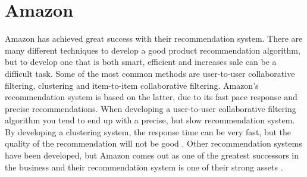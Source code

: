 \section{Amazon}
Amazon has achieved great success with their recommendation system. There are many different techniques to develop a good product recommendation algorithm, but to develop one that is both smart, efficient and increases sale can be a difficult task. Some of the most common methods are user-to-user collaborative filtering, clustering and item-to-item collaborative filtering. Amazon's recommendation system is based on the latter, due to its fast pace response and precise recommendations. When developing a user-to-user collaborative filtering algorithm you tend to end up with a precise, but slow recommendation system. By developing a clustering system, the response time can be very fast, but the quality of the recommendation will not be good \cite{AmazonRecommendations}. Other recommendation systems have been developed, but Amazon comes out as one of the greatest successors in the business and their recommendation system is one of their strong assets \cite{AmazonSuccess}.
